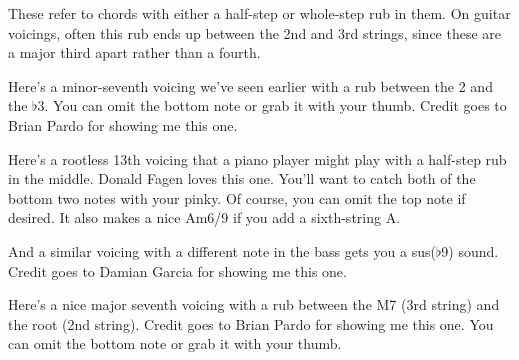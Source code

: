 
These refer to chords with either a half-step or whole-step rub in them.  On guitar voicings, often this rub ends up between the 2nd and 3rd strings, since these are a major third apart rather than a fourth.

\def\numfrets{6}

Here's a minor-seventh voicing we've seen earlier with a rub between the 2 and the $\flat$3.  You can omit the bottom note or grab it with your thumb.  Credit goes to Brian Pardo for showing me this one.


Here's a rootless 13th voicing that a piano player might play with a half-step rub in the middle.  Donald Fagen loves this one.  You'll want to catch both of the bottom two notes with your pinky.  Of course, you can omit the top note if desired.  It also makes a nice Am6/9 if you add a sixth-string A.


And a similar voicing with a different note in the bass gets you a sus($\flat$9) sound.  Credit goes to Damian Garcia for showing me this one.

Here's a nice major seventh voicing with a rub between the M7 (3rd string) and the root (2nd string).  Credit goes to Brian Pardo for showing me this one.  You can omit the bottom note or grab it with your thumb.

